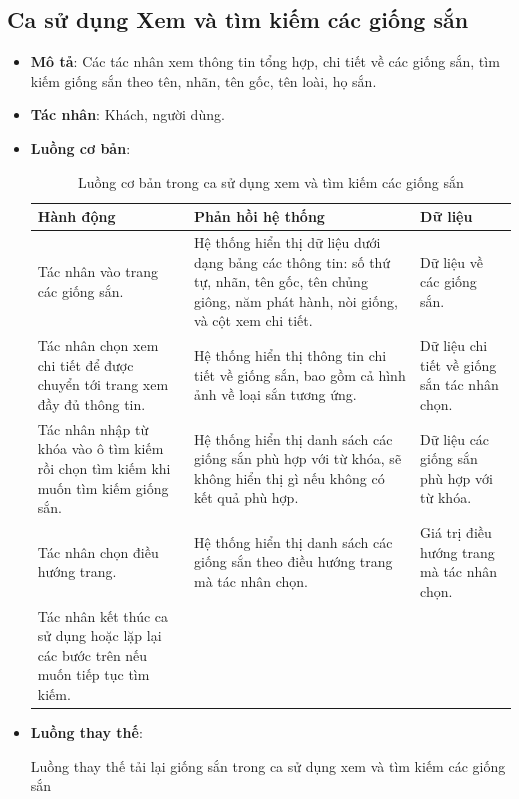 \documentclass[./../main.tex]{subfiles}
\begin{document}
\subsection{Ca sử dụng Xem và tìm kiếm các giống sắn}
\begin{itemize}
    \item \textbf{Mô tả}: Các tác nhân xem thông tin tổng hợp, chi tiết về các giống sắn, tìm kiếm giống sắn theo tên, nhãn, tên gốc, tên loài, họ sắn.
    \item \textbf{Tác nhân}: Khách, người dùng.
    \item \textbf{Luồng cơ bản}:
    \begin{table}[H]
    \caption{\label{uc-16}Luồng cơ bản trong ca sử dụng xem và tìm kiếm các giống sắn}
    \begin{tabularx}{\textwidth}{| X | X | X |}
        \hline
        \textbf{Hành động} & \textbf{Phản hồi hệ thống} & \textbf{Dữ liệu} \\ \hline
        Tác nhân vào trang các giống sắn. & Hệ thống hiển thị dữ liệu dưới dạng bảng các thông tin: số thứ tự, nhãn, tên gốc, tên chủng giông, năm phát hành, nòi giống, và cột xem chi tiết. & Dữ liệu về các giống sắn.
        \\ \hline
        Tác nhân chọn xem chi tiết để được chuyển tới trang xem đầy đủ thông tin. & Hệ thống hiển thị thông tin chi tiết về giống sắn, bao gồm cả hình ảnh về loại sắn tương ứng. & Dữ liệu chi tiết về giống sắn tác nhân chọn.
        \\ \hline
        Tác nhân nhập từ khóa vào ô tìm kiếm rồi chọn tìm kiếm khi muốn tìm kiếm giống sắn. & Hệ thống hiển thị danh sách các giống sắn phù hợp với từ khóa, sẽ không hiển thị gì nếu không có kết quả phù hợp. & Dữ liệu các giống sắn phù hợp với từ khóa.
        \\ \hline
        Tác nhân chọn điều hướng trang. & Hệ thống hiển thị danh sách các giống sắn theo điều hướng trang mà tác nhân chọn. & Giá trị điều hướng trang mà tác nhân chọn.
        \\ \hline
        Tác nhân kết thúc ca sử dụng hoặc lặp lại các bước trên nếu muốn tiếp tục tìm kiếm. & &
        \\ \hline
    \end{tabularx}
    \end{table}    
    \item \textbf{Luồng thay thế}:
        \begin{table}[H]
        \caption{\label{uc-17}Luồng thay thế tải lại giống sắn trong ca sử dụng xem và tìm kiếm các giống sắn}

\end{table}
\end{itemize}
\end{document}
